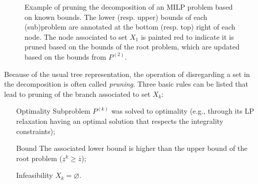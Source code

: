 \begin{figure}[h]
    \centering
    \caption{Example of pruning the decomposition of an MILP problem based on known bounds. The lower (resp. upper) bounds of each (sub)problem are annotated at the bottom (resp. top) right of each node. The node associated to set $X_1$ is painted red to indicate it is pruned based on the bounds of the root problem, which are updated based on the bounds from $P^{(2)}$.}
    \label{fig:pruning-example-milp}
\end{figure}

Because of the usual tree representation, the operation of disregarding a set in the decomposition is often called \emph{pruning}.
Three basic rules can be listed that lead to pruning of the branch associated to set $X_k$:
\begin{itemize}
    \item[Optimality] Subproblem $P^{(k)}$ was solved to optimality (e.g., through its LP relaxation having an optimal solution that respects the integrality constraints);
    \item[Bound] The associated lower bound is higher than the upper bound of the root problem ($\underline{z}^{k}\ge \overline{z}$);
    \item[Infeasibility] $X_k = \varnothing$.
\end{itemize}


